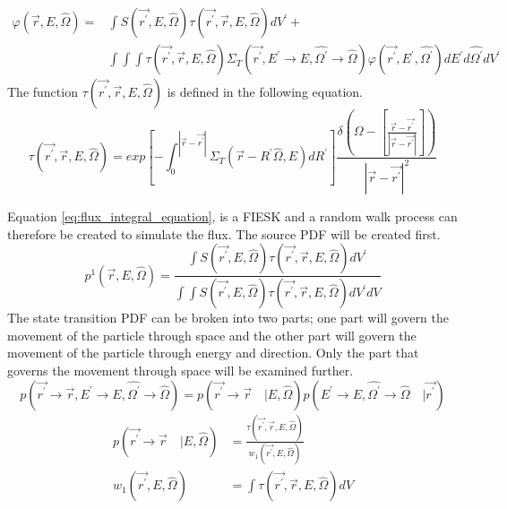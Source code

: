 \begin{equation}
  \begin{split}
    \varphi(\vec{r},E,\hat{\Omega}) = & \int S(\vec{r^{'}},E,\hat{\Omega})
    \tau(\vec{r^{'}},\vec{r},E,\hat{\Omega}) dV^{'} + \\
    & \int\int\int \tau(\vec{r^{'}},\vec{r},E,\hat{\Omega})
    \Sigma_T(\vec{r^{'}},E^{'} \to E, \hat{\Omega^{'}} \to \hat{\Omega})
    \varphi(\vec{r^{'}},E^{'},\hat{\Omega^{'}}) dE^{'} d\hat{\Omega^{'}} dV^{'}
  \end{split}
  \label{eq:flux_integral_equation}
\end{equation}
The function $\tau(\vec{r^{'}},\vec{r},E,\hat{\Omega})$ is defined in the following 
equation.
\begin{equation}
  \tau(\vec{r^{'}},\vec{r},E,\hat{\Omega}) = 
  exp\left[-\int_0^{|\vec{r} - \vec{r^{'}}|} 
              \Sigma_T(\vec{r}-R^{'}\hat{\Omega},E)dR^{'} \right]
    \frac{\delta \left(\Omega - \left[\frac{\vec{r} - \vec{r^{'}}}
        {|\vec{r} - \vec{r^{'}}|}\right]\right)} 
    {|\vec{r} - \vec{r^{'}}|^2}
  \label{eq:unnormalized_transport_kernel}
\end{equation}

Equation \ref{eq:flux_integral_equation}, is a FIESK and a random walk process 
can therefore be created to simulate the flux. The source PDF will be created 
first. 
\begin{equation}
  p^1(\vec{r},E,\hat{\Omega}) = \frac{\int S(\vec{r^{'}},E,\hat{\Omega})
    \tau(\vec{r^{'}},\vec{r},E,\hat{\Omega}) dV^{'}}{\int\int S(\vec{r^{'}},E,\hat{\Omega})
    \tau(\vec{r^{'}},\vec{r},E,\hat{\Omega}) dV^{'} dV}
\end{equation}
The state transition PDF can be broken into two parts; one part will govern the
movement of the particle through space and the other part will govern the 
movement of the particle through energy and direction. Only the part that
governs the movement through space will be examined further.
\begin{equation}
  p(\vec{r^{'}} \to \vec{r}, E^{'} \to E, \hat{\Omega^{'}} \to \hat{\Omega}) =
  p(\vec{r^{'}} \to \vec{r}\quad| E,\hat{\Omega})
  p(E^{'} \to E, \hat{\Omega^{'}} \to \hat{\Omega}\quad|\vec{r^{'}})
\end{equation}
\begin{align}
  p(\vec{r^{'}} \to \vec{r} \quad | E,\hat{\Omega}) & =
  \frac{\tau(\vec{r^{'}},\vec{r},E,\hat{\Omega})}{w_1(\vec{r^{'}},E,\hat{\Omega})}  \\
  w_1(\vec{r^{'}},E,\hat{\Omega}) & = \int \tau(\vec{r^{'}},\vec{r},E,\hat{\Omega}) dV 
\end{align}

